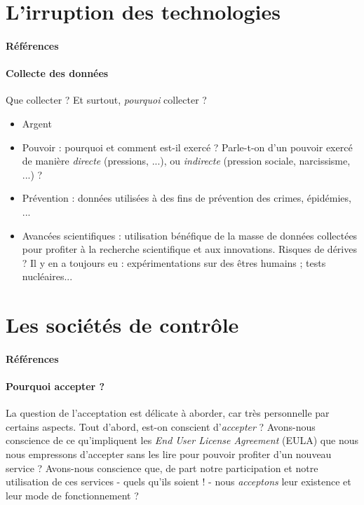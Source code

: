 \section{L'irruption des technologies}
\paragraph{Références} \cite{Damasio:0} \cite{Marx:1} \cite{TechnoSocio:0} \cite{GhostInTheShell}

\paragraph{Collecte des données} Que collecter ? Et surtout, \emph{pourquoi} collecter ?
\begin{itemize}
    \item Argent
    \item Pouvoir : pourquoi et comment est-il exercé ? Parle-t-on d'un pouvoir exercé de
    manière \emph{directe} (pressions, ...), ou \emph{indirecte} (pression sociale,
    narcissisme, ...) ?
    \item Prévention : données utilisées à des fins de prévention des crimes, épidémies, ...
    \item Avancées scientifiques : utilisation bénéfique de la masse de données collectées
    pour profiter à la recherche scientifique et aux innovations. Risques de dérives ? Il y
    en a toujours eu : expérimentations sur des êtres humains ; tests nucléaires... 
\end{itemize}


\section{Les sociétés de contrôle}
\paragraph{Références} \cite{Huxley:0} \cite{Orwell:0} \cite{TechnoSocio:1}

\paragraph{Pourquoi accepter ?} La question de l'acceptation est délicate à aborder, car
très personnelle par certains aspects. Tout d'abord, est-on conscient d'\emph{accepter} ?
Avons-nous conscience de ce qu'impliquent les \emph{End User License Agreement} (EULA) que
nous nous empressons d'accepter sans les lire pour pouvoir profiter d'un nouveau service ?
Avons-nous conscience que, de part notre participation et notre utilisation de ces services
- quels qu'ils soient ! - nous \emph{acceptons} leur existence et leur mode de fonctionnement ?

